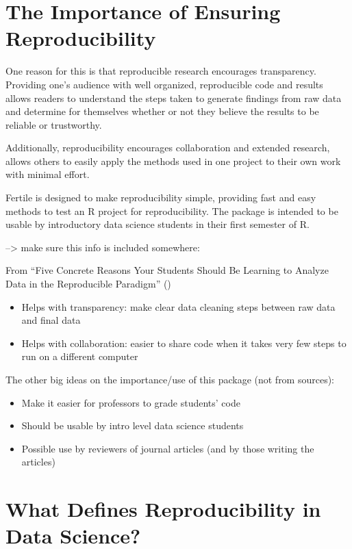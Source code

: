 \documentclass[12pt]{article}
\providecommand{\tightlist}{%
  \setlength{\itemsep}{0pt}\setlength{\parskip}{0pt}}
\begin{document}
\section{The Importance of Ensuring
Reproducibility}\label{the-importance-of-ensuring-reproducibility}

One reason for this is that reproducible research encourages
transparency. Providing one's audience with well organized, reproducible
code and results allows readers to understand the steps taken to
generate findings from raw data and determine for themselves whether or
not they believe the results to be reliable or trustworthy.

Additionally, reproducibility encourages collaboration and extended
research, allows others to easily apply the methods used in one project
to their own work with minimal effort. \citet{bray2014five}

Fertile is designed to make reproducibility simple, providing fast and
easy methods to test an R project for reproducibility. The package is
intended to be usable by introductory data science students in their
first semester of R.

--\textgreater{} make sure this info is included somewhere:

From ``Five Concrete Reasons Your Students Should Be Learning to Analyze
Data in the Reproducible Paradigm'' (\citet{bray2014five})

\begin{itemize}
\tightlist
\item
  Helps with transparency: make clear data cleaning steps between raw
  data and final data
\item
  Helps with collaboration: easier to share code when it takes very few
  steps to run on a different computer
\end{itemize}

The other big ideas on the importance/use of this package (not from
sources):

\begin{itemize}
\tightlist
\item
  Make it easier for professors to grade students' code
\item
  Should be usable by intro level data science students
\item
  Possible use by reviewers of journal articles (and by those writing
  the articles)
\end{itemize}

\section{What Defines Reproducibility in Data
Science?}\label{what-defines-reproducibility-in-data-science}
\end{document}
